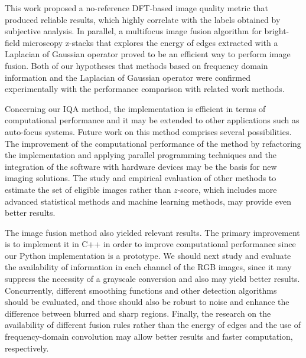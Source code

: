 This work proposed a no-reference DFT-based image quality metric that produced reliable results, which highly correlate with the labels obtained by subjective analysis. In parallel, a multifocus image fusion algorithm for bright-field microscopy z-stacks that explores the energy of edges extracted with a Laplacian of Gaussian operator proved to be an efficient way to perform image fusion. Both of our hypotheses that methods based on frequency domain information and the Laplacian of Gaussian operator were confirmed experimentally with the performance comparison with related work methods.

Concerning our IQA method, the implementation is efficient in terms of computational performance and it may be extended to other applications such as auto-focus systems. Future work on this method comprises several possibilities. The improvement of the computational performance of the method by refactoring the implementation and applying parallel programming techniques and the integration of the software with hardware devices may be the basis for new imaging solutions. The study and empirical evaluation of other methods to estimate the set of eligible images rather than $z$-score, which includes more advanced statistical methods and machine learning methods, may provide even better results.

The image fusion method also yielded relevant results. The primary improvement is to implement it in C++ in order to improve computational performance since our Python implementation is a prototype. We should next study and evaluate the availability of information in each channel of the RGB images, since it may suppress the necessity of a grayscale conversion and also may yield better results. Concurrently, different smoothing functions and other detection algorithms should be evaluated, and those should also be robust to noise and enhance the difference between blurred and sharp regions. Finally, the research on the availability of different fusion rules rather than the energy of edges and the use of frequency-domain convolution may allow better results and faster computation, respectively.